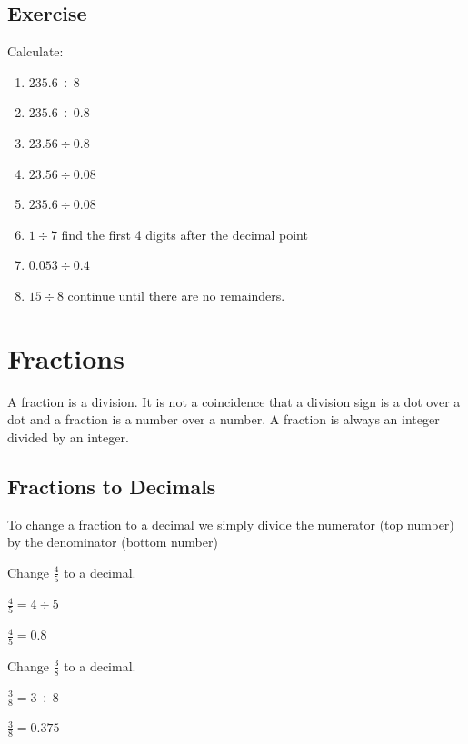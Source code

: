 \subsection{Exercise}
Calculate:
\begin{enumerate}
	\item $235.6 \div 8$
	\item $235.6 \div 0.8$
	\item $23.56 \div 0.8$
	\item $23.56 \div 0.08$
	\item $235.6 \div 0.08$
	\item $1 \div 7$ find the first 4 digits after the decimal point
	\item $0.053 \div 0.4$
	\item $15 \div 8$ continue until there are no remainders.
\end{enumerate}
\section{Fractions}
A fraction is a division.  It is not a coincidence that a division sign is a dot over a dot and a fraction is a number over a number.  A fraction is always an integer divided by an integer.

\subsection{Fractions to Decimals}
To change a fraction to a decimal we simply divide the numerator (top number) by the denominator (bottom number)
\begin{exmp}
	Change $\frac{4}{5}$ to a decimal.

	$\frac{4}{5} = 4 \div 5$

	$\frac{4}{5} = 0.8$
\end{exmp}
\begin{exmp}
	Change $\frac{3}{8}$ to a decimal.

	$\frac{3}{8} = 3 \div 8$

	$\frac{3}{8} = 0.375$
\end{exmp}
